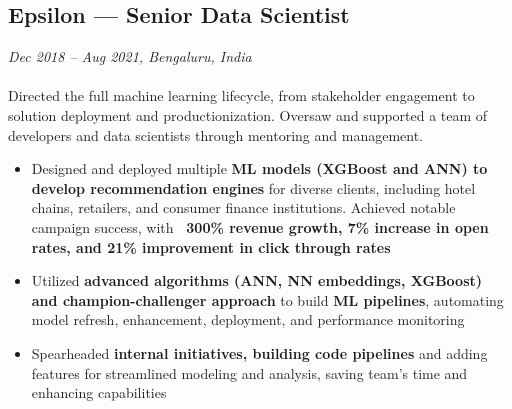 \subsection*{Epsilon — Senior Data Scientist}
\textit{Dec 2018 – Aug 2021, Bengaluru, India}
\\
\\
Directed the full machine learning lifecycle, from stakeholder engagement to solution deployment and productionization. Oversaw and supported a team of developers and data scientists through mentoring and management.
\begin{itemize}[leftmargin=1em]
    \item Designed and deployed multiple \textbf{ML models (XGBoost and ANN) to develop recommendation engines} for diverse clients, including hotel chains, retailers, and consumer finance institutions. Achieved notable campaign success, with \textbf{~300\% revenue growth, 7\% increase in open rates, and 21\% improvement in click through rates}
    \item Utilized \textbf{advanced algorithms (ANN, NN embeddings, XGBoost) and champion-challenger approach} to build \textbf{ML pipelines}, automating model refresh, enhancement, deployment, and performance monitoring
    \item Spearheaded \textbf{internal initiatives, building code pipelines} and adding features for streamlined modeling and analysis, saving team's time and enhancing capabilities
\end{itemize}
